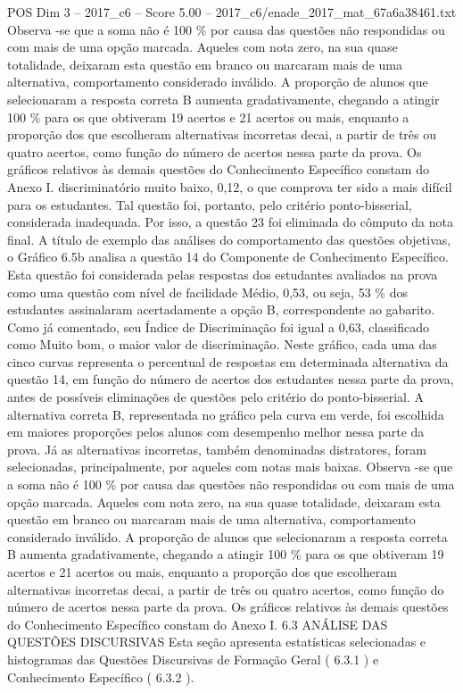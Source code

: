 \begin{textsample}{POS Dim 3 – 2017\_c6 – Score 5.00 – 2017\_c6/enade\_2017\_mat\_67a6a38461.txt}
Observa -se que a soma não é 100 \% por causa das questões não respondidas ou com mais de uma opção marcada.
Aqueles com nota zero, na sua quase totalidade, deixaram esta questão em branco ou marcaram mais de uma alternativa, comportamento considerado inválido.
A proporção de alunos que selecionaram a resposta correta B aumenta gradativamente, chegando a atingir 100 \% para os que obtiveram 19 acertos e 21 acertos ou mais, enquanto a proporção dos que escolheram alternativas incorretas decai, a partir de três ou quatro acertos, como função do número de acertos nessa parte da prova.
Os gráficos relativos às demais questões do Conhecimento Específico constam do Anexo I. discriminatório muito baixo, 0,12, o que comprova ter sido a mais difícil para os estudantes.
Tal questão foi, portanto, pelo critério ponto-bisserial, considerada inadequada.
Por isso, a questão 23 foi eliminada do cômputo da nota final.
A título de exemplo das análises do comportamento das questões objetivas, o Gráfico 6.5b analisa a questão 14 do Componente de Conhecimento Específico.
Esta questão foi considerada pelas respostas dos estudantes avaliados na prova como uma questão com nível de facilidade Médio, 0,53, ou seja, 53 \% dos estudantes assinalaram acertadamente a opção B, correspondente ao gabarito.
Como já comentado, seu Índice de Discriminação foi igual a 0,63, classificado como Muito bom, o maior valor de discriminação.
Neste gráfico, cada uma das cinco curvas representa o percentual de respostas em determinada alternativa da questão 14, em função do número de acertos dos estudantes nessa parte da prova, antes de possíveis eliminações de questões pelo critério do ponto-bisserial.
A alternativa correta B, representada no gráfico pela curva em verde, foi escolhida em maiores proporções pelos alunos com desempenho melhor nessa parte da prova.
Já as alternativas incorretas, também denominadas distratores, foram selecionadas, principalmente, por aqueles com notas mais baixas.
Observa -se que a soma não é 100 \% por causa das questões não respondidas ou com mais de uma opção marcada.
Aqueles com nota zero, na sua quase totalidade, deixaram esta questão em branco ou marcaram mais de uma alternativa, comportamento considerado inválido.
A proporção de alunos que selecionaram a resposta correta B aumenta gradativamente, chegando a atingir 100 \% para os que obtiveram 19 acertos e 21 acertos ou mais, enquanto a proporção dos que escolheram alternativas incorretas decai, a partir de três ou quatro acertos, como função do número de acertos nessa parte da prova.
Os gráficos relativos às demais questões do Conhecimento Específico constam do Anexo I. 6.3 ANÁLISE DAS QUESTÕES DISCURSIVAS Esta seção apresenta estatísticas selecionadas e histogramas das Questões Discursivas de Formação Geral ( 6.3.1 ) e Conhecimento Específico ( 6.3.2 ).

\end{textsample}
